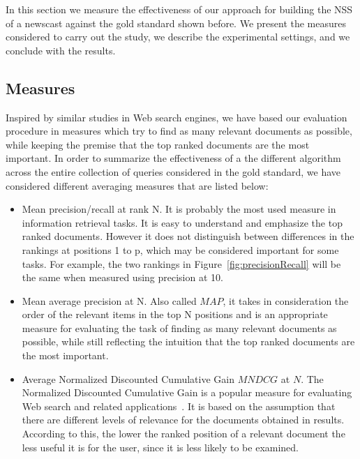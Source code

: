 \documentclass{llncs}
\begin{document}
In this section we measure the effectiveness of our approach for building the NSS of a newscast against the gold standard shown before. We present the measures considered to carry out the study, we describe the experimental settings, and we conclude with the results.

\subsection{Measures}
Inspired by similar studies in Web search engines, we have based our evaluation procedure in measures which try to find as many relevant documents as possible, while keeping the premise that the top ranked documents are the most important. In order to summarize the effectiveness of a the different algorithm across the entire collection of queries considered in the gold standard, we have considered different averaging measures that are listed below:

\begin{itemize}
\item Mean precision/recall at rank N. It is probably the most used measure in information retrieval tasks. It is easy to understand and emphasize the top ranked documents. However it does not distinguish between differences in the rankings at positions 1 to p, which may be considered important for some tasks. For example, the two rankings in Figure~\ref{fig:precisionRecall} will be the same when measured using precision at 10.
\item Mean average precision at N. Also called $MAP$, it takes in consideration the order of the relevant items in the top N positions and is an appropriate measure for evaluating the task of finding as many relevant documents as possible, while still reflecting the intuition that the top ranked documents are the most important.
\item Average Normalized Discounted Cumulative Gain $MNDCG$ at $N$. The Normalized Discounted Cumulative Gain is a popular measure for evaluating Web search and related applications~\cite{croft2010}. It is based on the assumption that there are different levels of relevance for the documents obtained in results. According to this, the lower the ranked position of a relevant document the less useful it is for the user, since it is less likely to be examined. 
\end{itemize}
\end{document}
